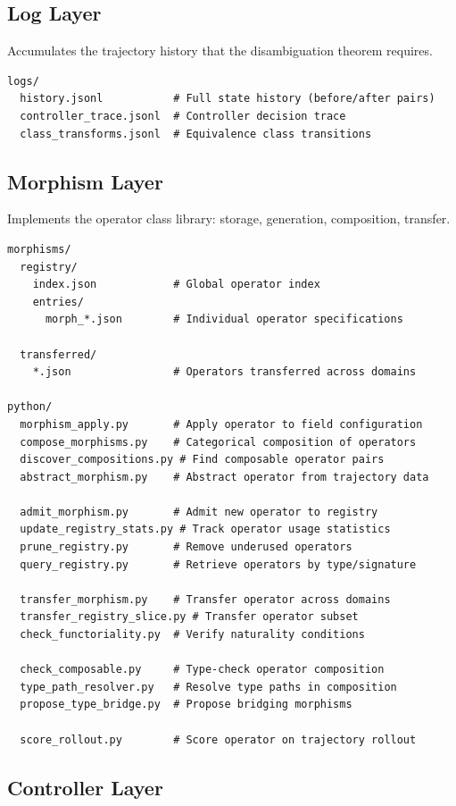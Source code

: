 \documentclass[12pt, oneside]{article}
\begin{document}
\subsection{Log Layer}

Accumulates the trajectory history that the disambiguation theorem requires.
\begin{verbatim}
logs/
  history.jsonl           # Full state history (before/after pairs)
  controller_trace.jsonl  # Controller decision trace
  class_transforms.jsonl  # Equivalence class transitions
\end{verbatim}

\subsection{Morphism Layer}

Implements the operator class library: storage, generation, composition, transfer.
\begin{verbatim}
morphisms/
  registry/
    index.json            # Global operator index
    entries/
      morph_*.json        # Individual operator specifications

  transferred/
    *.json                # Operators transferred across domains

python/
  morphism_apply.py       # Apply operator to field configuration
  compose_morphisms.py    # Categorical composition of operators
  discover_compositions.py # Find composable operator pairs
  abstract_morphism.py    # Abstract operator from trajectory data

  admit_morphism.py       # Admit new operator to registry
  update_registry_stats.py # Track operator usage statistics
  prune_registry.py       # Remove underused operators
  query_registry.py       # Retrieve operators by type/signature

  transfer_morphism.py    # Transfer operator across domains
  transfer_registry_slice.py # Transfer operator subset
  check_functoriality.py  # Verify naturality conditions

  check_composable.py     # Type-check operator composition
  type_path_resolver.py   # Resolve type paths in composition
  propose_type_bridge.py  # Propose bridging morphisms

  score_rollout.py        # Score operator on trajectory rollout
\end{verbatim}

\subsection{Controller Layer}
\end{document}
